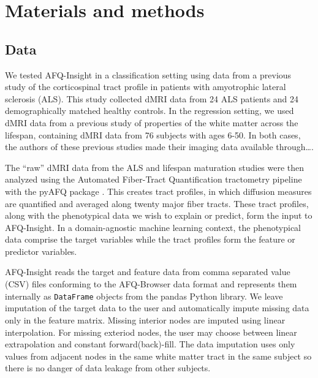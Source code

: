 \section*{Materials and methods}

\subsection*{Data}

We tested AFQ-Insight in a classification setting using data from a previous study of the corticospinal tract profile in patients with amyotrophic lateral sclerosis (ALS)\cite{sarica2017corticospinal}. This study collected dMRI data from 24 ALS patients and 24 demographically matched healthy controls. In the regression setting, we used dMRI data from a previous study of properties of the white matter across the lifespan\cite{yeatman2014lifespan}, containing dMRI data from 76 subjects with ages 6-50. In both cases, the authors of these previous studies made their imaging data available through\ldots {}.

The ``raw'' dMRI data from the ALS and lifespan maturation studies were then analyzed using the Automated Fiber-Tract Quantification tractometry pipeline\cite{yeatman2012tract} with the pyAFQ package\cite{pyAFQ} . This creates tract profiles, in which diffusion measures are quantified and averaged along twenty major fiber tracts. These tract profiles, along with the phenotypical data we wish to explain or predict, form the input to AFQ-Insight. In a domain-agnostic machine learning context, the phenotypical data comprise the target variables while the tract profiles form the feature or predictor variables.

AFQ-Insight reads the target and feature data from comma separated value (CSV) files conforming to the AFQ-Browser data format\cite{yeatman2018browser}  and represents them internally as \lstinline{DataFrame} objects from the pandas Python library\cite{mckinney2010data}. We leave imputation of the target data to the user and automatically impute missing data only in the feature matrix. Missing interior nodes are imputed using linear interpolation. For missing exteriod nodes, the user may choose between linear extrapolation and constant forward(back)-fill. The data imputation uses only values from adjacent nodes in the same white matter tract in the same subject so there is no danger of data leakage from other subjects.


